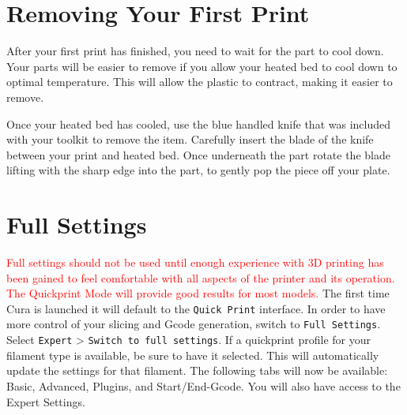 

\section{Removing Your First Print}
After your first print has finished, you need to wait for the part to cool down.  Your parts will be easier to remove if you allow your heated bed to cool down to optimal temperature. This will allow the plastic to contract, making it easier to remove. 

Once your heated bed has cooled, use the blue handled knife that was included with your toolkit to remove the item. Carefully insert the blade of the knife between your print and heated bed. Once underneath the part rotate the blade lifting with the sharp edge into the part, to gently pop the piece off your plate.

\section{Full Settings}
\textcolor{red}{Full settings should not be used until enough experience with 3D printing has been gained to feel comfortable with all aspects of the printer and its operation. The Quickprint Mode will provide good results for most models.}
The first time Cura is launched it will default to the \texttt{Quick Print} interface. In order to have more control of your slicing and Gcode generation, switch to \texttt{Full Settings}. Select \texttt{Expert} > \texttt{Switch to full settings}. If a quickprint profile for your filament type is available, be sure to have it selected. This will automatically update the settings for that filament. The following tabs will now be available: Basic, Advanced, Plugins, and Start/End-Gcode. You will also have access to the Expert Settings. 


